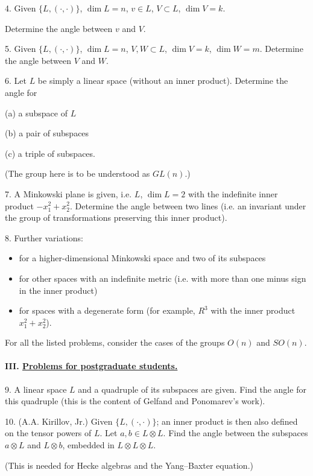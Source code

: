 4. Given $\{L,(\cdot,\cdot)\}$, $\dim L=n$, $v\in L$, $V\subset L$,
$\dim V=k$.

Determine the angle between $v$ and $V$.

5. Given $\{L,(\cdot,\cdot)\}$, $\dim L=n$, $V,W\subset L$,
$\dim V=k$, $\dim W=m$. Determine the angle between $V$ and $W$.

6. Let $L$ be simply a linear space (without an inner
product). Determine the angle for

(a) a subspace of $L$

(b) a pair of subspaces

(c) a triple of subspaces.

(The group here is to be understood as $GL(n)$.)

7. A Minkowski plane is given, i.e. $L$, $\dim L=2$
with the indefinite inner product $-x_1^2+x_2^2$.
Determine the angle between two lines (i.e. an invariant
under the group of transformations preserving this
inner product).

8. Further variations:
\begin{itemize}
\item[---] for a higher-dimensional Minkowski space
and two of its subspaces
\item[---] for other spaces with an indefinite metric
(i.e. with more than one minus sign in the inner product)
\item[---] for spaces with a degenerate form (for example, $R^3$
with the inner product $x_1^2+x_2^2$).
\end{itemize}

For all the listed problems, consider the cases of the
groups $O(n)$ and $SO(n)$.

\paragraph*{III. \underline{Problems for postgraduate students.}}
9. A linear space $L$ and a quadruple of its subspaces are given. Find the angle
for this quadruple (this is the content of Gelfand and Ponomarev's work).

10. (A.A. Kirillov, Jr.) Given $\{L,(\cdot,\cdot)\}$; an inner
product is then also defined on the tensor powers of $L$. Let
$a,b\in L\otimes L$. Find the angle between the subspaces $a\otimes L$ and
$L\otimes b$, embedded in $L\otimes L\otimes L$.

(This is needed for Hecke algebras and the Yang--Baxter equation.)

